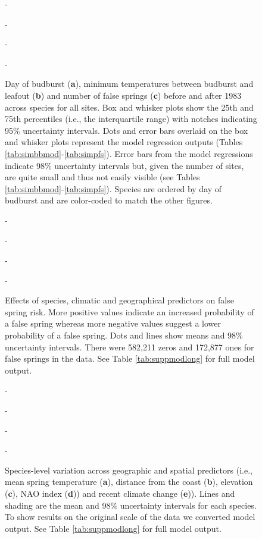 \documentclass{article}\usepackage[]{graphicx}\usepackage[]{color}
\begin{document}
{\begin{figure} [H]
  -\begin{center}
  -\caption{Day of budburst (\textbf{a}), minimum temperatures between budburst and leafout (\textbf{b}) and number of false springs (\textbf{c}) before and after 1983 across species for all sites. Box and whisker plots show the 25th and 75th percentiles (i.e., the interquartile range) with notches indicating 95\% uncertainty intervals. Dots and error bars overlaid on the box and whisker plots represent the model regression outputs (Tables \ref{tab:simbbmod}-\ref{tab:simpfs}). Error bars from the model regressions indicate 98\% uncertainty intervals but, given the number of sites, are quite small and thus not easily visible (see Tables \ref{tab:simbbmod}-\ref{tab:simpfs}). Species are ordered by day of budburst and are color-coded to match the other figures.  }\label{fig:boxfs}
  -\end{center}
  -\end{figure}}
  
  
{\begin{figure} [H]
  -\begin{center}
  -\caption{Effects of species, climatic and geographical predictors on false spring risk. More positive values indicate an increased probability of a false spring whereas more negative values suggest a lower probability of a false spring. Dots and lines show means and 98\% uncertainty intervals. There were 582,211 zeros and 172,877 ones for false springs in the data. See Table \ref{tab:suppmodlong} for full model output.}\label{fig:maineffects}
  -\end{center}
  -\end{figure}}

  
{\begin{figure} [H]
  -\begin{center}
  -\caption{Species-level variation across geographic and spatial predictors (i.e., mean spring temperature (\textbf{a}), distance from the coast (\textbf{b}), elevation (\textbf{c}), NAO index (\textbf{d})) and recent climate change (\textbf{e})). Lines and shading are the mean and 98\% uncertainty intervals for each species. To show results on the original scale of the data we converted model output. See Table \ref{tab:suppmodlong} for full model output. }\label{fig:spp}
  -\end{center}
  -\end{figure}}


  
\end{document}
